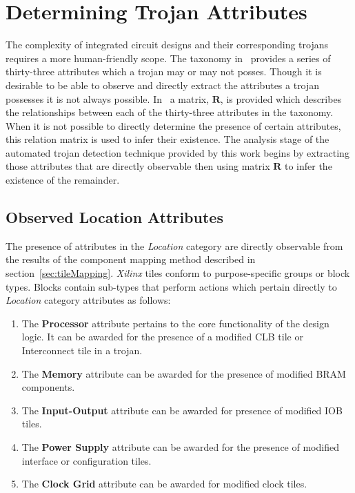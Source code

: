 \documentclass[journal, hidelinks]{IEEEtran}
\begin{document}
\section{Determining Trojan Attributes} \label{sec:trojanAttributes}
The complexity of integrated circuit designs and their corresponding trojans requires a more human-friendly scope.
The taxonomy in~\cite{samerAttribute} provides a series of thirty-three attributes which a trojan may or may not posses.
Though it is desirable to be able to observe and directly extract the attributes a trojan possesses it is not always possible. 
In~\cite{samerAttribute} a matrix, $\mathbf{R}$, is provided which describes the relationships between each of the thirty-three attributes in the taxonomy.
When it is not possible to directly determine the presence of certain attributes, this relation matrix is used to infer their existence.
The analysis stage of the automated trojan detection technique provided by this work begins by extracting those attributes that are directly observable then using matrix $\mathbf{R}$ to infer the existence of the remainder. 

\subsection{Observed Location Attributes}
The presence of attributes in the \textit{Location} category are directly observable from the results of the component mapping method described in section~\ref{sec:tileMapping}.
\textit{Xilinx} tiles conform to purpose-specific groups or block types.
Blocks contain sub-types that perform actions which pertain directly to \textit{Location} category attributes as follows: 
\begin{enumerate}
	\item The \textbf{Processor} attribute pertains to the core functionality of the design logic. It can be awarded for the presence of a modified CLB tile or Interconnect tile in a trojan.
	\item The \textbf{Memory} attribute can be awarded for the presence of modified BRAM components.
	\item The \textbf{Input-Output} attribute can be awarded for presence of modified IOB tiles.
	\item The \textbf{Power Supply} attribute can be awarded for the presence of modified interface or configuration tiles.
	\item The \textbf{Clock Grid} attribute can be awarded for modified clock tiles.
\end{enumerate}
\end{document}
